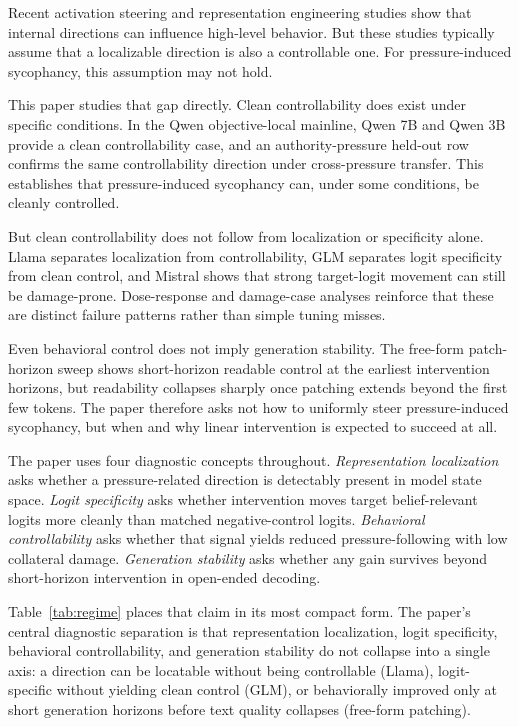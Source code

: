 \documentclass[11pt]{article}
\begin{document}
Recent activation steering and representation engineering studies show that internal directions can influence high-level behavior.
But these studies typically assume that a localizable direction is also a controllable one.
For pressure-induced sycophancy, this assumption may not hold.

This paper studies that gap directly.
Clean controllability does exist under specific conditions.
In the Qwen objective-local mainline, Qwen 7B and Qwen 3B provide a clean controllability case, and an authority-pressure held-out row confirms the same controllability direction under cross-pressure transfer.
This establishes that pressure-induced sycophancy can, under some conditions, be cleanly controlled.

But clean controllability does not follow from localization or specificity alone.
Llama separates localization from controllability, GLM separates logit specificity from clean control, and Mistral shows that strong target-logit movement can still be damage-prone.
Dose-response and damage-case analyses reinforce that these are distinct failure patterns rather than simple tuning misses.

Even behavioral control does not imply generation stability.
The free-form patch-horizon sweep shows short-horizon readable control at the earliest intervention horizons, but readability collapses sharply once patching extends beyond the first few tokens.
The paper therefore asks not how to uniformly steer pressure-induced sycophancy, but when and why linear intervention is expected to succeed at all.

The paper uses four diagnostic concepts throughout.
\emph{Representation localization} asks whether a pressure-related direction is detectably present in model state space.
\emph{Logit specificity} asks whether intervention moves target belief-relevant logits more cleanly than matched negative-control logits.
\emph{Behavioral controllability} asks whether that signal yields reduced pressure-following with low collateral damage.
\emph{Generation stability} asks whether any gain survives beyond short-horizon intervention in open-ended decoding.

Table~\ref{tab:regime} places that claim in its most compact form.
The paper's central diagnostic separation is that representation localization, logit specificity, behavioral controllability, and generation stability do not collapse into a single axis: a direction can be locatable without being controllable (Llama), logit-specific without yielding clean control (GLM), or behaviorally improved only at short generation horizons before text quality collapses (free-form patching).
\end{document}
